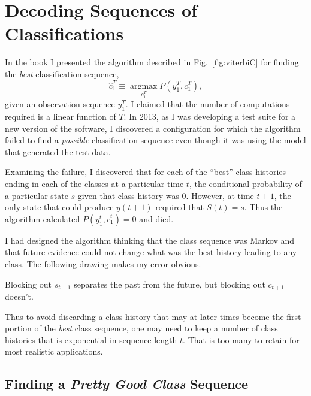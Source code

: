 \documentclass[prelim,showlabels]{book}
\newcommand{\argmax}{\operatorname*{argmax}}
\begin{document}
\section{Decoding Sequences of Classifications}
\label{sec:V4Class}

In the book I presented the algorithm described in
Fig.~\ref{fig:viterbiC} for finding the \emph{best} classification
sequence,
\begin{equation*}
  \hat c_1^T \equiv \argmax_{c_1^T} P(y_1^T,c_1^T),
\end{equation*}
given an observation sequence $y_1^T$.  I claimed that the number of
computations required is a linear function of $T$.  In 2013, as I was
developing a test suite for a new version of the software, I
discovered a configuration for which the algorithm failed to find a
\emph{possible} classification sequence even though it was using the
model that generated the test data.

Examining the failure, I discovered that for each of the ``best''
class histories ending in each of the classes at a particular time
$t$, the conditional probability of a particular state $s$ given that
class history was 0.  However, at time $t+1$, the only state that
could produce $y(t+1)$ required that $S(t)=s$.  Thus the algorithm
calculated $P(y_1^{t}, \hat c_1^{t}) = 0$ and died.

I had designed the algorithm thinking that the class sequence was
Markov and that future evidence could not change what was the best
history leading to any class.  The following drawing makes my error
obvious.
\begin{center}
  \resizebox{0.75\columnwidth}{!}{}
\end{center}
Blocking out $s_{t+1}$ separates the past from the future, but
blocking out $c_{t+1}$ doesn't.

Thus to avoid discarding a class history that may at later times
become the first portion of the \emph{best} class sequence, one may
need to keep a number of class histories that is exponential in
sequence length $t$.  That is too many to retain for most realistic
applications.

\subsection{Finding a \emph{Pretty Good Class} Sequence}
\label{sec:prettygood}
\end{document}

